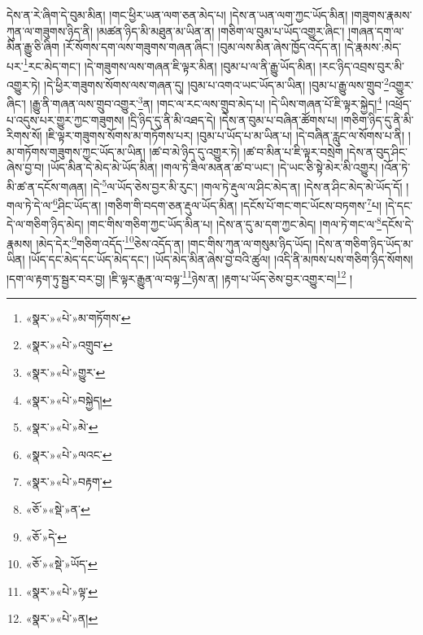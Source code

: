 དེས་ན་རེ་ཞིག་དེ་བུམ་མིན། །གང་ཕྱིར་ཡན་ལག་ཅན་མེད་པ། །དེས་ན་ཡན་ལག་ཀྱང་ཡོད་མིན། །གཟུགས་རྣམས་ཀུན་ལ་གཟུགས་ཉིད་ནི། །མཚན་ཉིད་མི་མཐུན་མ་ཡིན་ན། །གཅིག་ལ་བུམ་པ་ཡོད་འགྱུར་ཞིང་། །གཞན་དག་ལ་མིན་རྒྱུ་ཅི་ཞིག །རོ་སོགས་དག་ལས་གཟུགས་གཞན་ཞིང་། །བུམ་ལས་མིན་ཞེས་ཁྱོད་འདོད་ན། །དེ་རྣམས་:མེད་པར་\footnote{«སྣར་»«པེ་»མ་གཏོགས་}རང་མེད་གང་། །དེ་གཟུགས་ལས་གཞན་ཇི་ལྟར་མིན། །བུམ་པ་ལ་ནི་རྒྱུ་ཡོད་མིན། །རང་ཉིད་འབྲས་བུར་མི་འགྱུར་ཏེ། །དེ་ཕྱིར་གཟུགས་སོགས་ལས་གཞན་དུ། །བུམ་པ་འགའ་ཡང་ཡོད་མ་ཡིན། །བུམ་པ་རྒྱུ་ལས་གྲུབ་\footnote{«སྣར་»«པེ་»འགྲུབ་}འགྱུར་ཞིང་། །རྒྱུ་ནི་གཞན་ལས་གྲུབ་འགྱུར་\footnote{«སྣར་»«པེ་»གྱུར་}ན། །གང་ལ་རང་ལས་གྲུབ་མེད་པ། །དེ་ཡིས་གཞན་པོ་ཇི་ལྟར་སྐྱེད།\footnote{«སྣར་»«པེ་»བསྐྱེད།} །འཕྲོད་པ་འདུས་པར་གྱུར་ཀྱང་གཟུགས། །དྲི་ཉིད་དུ་ནི་མི་འཐད་དེ། །དེས་ན་བུམ་པ་བཞིན་ཚོགས་པ། །གཅིག་ཉིད་དུ་ནི་མི་རིགས་སོ། །ཇི་ལྟར་གཟུགས་སོགས་མ་གཏོགས་པར། །བུམ་པ་ཡོད་པ་མ་ཡིན་པ། །དེ་བཞིན་རླུང་ལ་སོགས་པ་ནི། །མ་གཏོགས་གཟུགས་ཀྱང་ཡོད་མ་ཡིན། །ཚ་བ་མེ་ཉིད་དུ་འགྱུར་ཏེ། །ཚ་བ་མིན་པ་ཇི་ལྟར་བསྲེག །དེས་ན་བུད་ཤིང་ཞེས་བྱ་བ། །ཡོད་མིན་དེ་མེད་མེ་ཡོད་མིན། །གལ་ཏེ་ཟིལ་མནན་ཚ་བ་ཡང་། །དེ་ཡང་ཅི་སྟེ་མེར་མི་འགྱུར། །འོན་ཏེ་མི་ཚ་ན་དངོས་གཞན། །དེ་\footnote{«སྣར་»«པེ་»མེ་}ལ་ཡོད་ཅེས་བྱར་མི་རུང་། །གལ་ཏེ་རྡུལ་ལ་ཤིང་མེད་ན། །དེས་ན་ཤིང་མེད་མེ་ཡོད་དོ། །གལ་ཏེ་དེ་ལ་\footnote{«སྣར་»«པེ་»ལའང་}ཤིང་ཡོད་ན། །གཅིག་གི་བདག་ཅན་རྡུལ་ཡོད་མིན། །དངོས་པོ་གང་གང་ཡོངས་བཏགས་\footnote{«སྣར་»«པེ་»བརྟག་}པ། །དེ་དང་དེ་ལ་གཅིག་ཉིད་མེད། །གང་གིས་གཅིག་ཀྱང་ཡོད་མིན་པ། །དེས་ན་དུ་མ་དག་ཀྱང་མེད། །གལ་ཏེ་གང་ལ་\footnote{«ཅོ་»«སྡེ་»ན་}དངོས་དེ་རྣམས། །མེད་དེར་\footnote{«ཅོ་»དེ་}གཅིག་འདོད་\footnote{«ཅོ་»«སྡེ་»ཡོད་}ཅེས་འདོད་ན། །གང་གིས་ཀུན་ལ་གསུམ་ཉིད་ཡོད། །དེས་ན་གཅིག་ཉིད་ཡོད་མ་ཡིན། །ཡོད་དང་མེད་དང་ཡོད་མེད་དང་། །ཡོད་མེད་མིན་ཞེས་བྱ་བའི་ཚུལ། །འདི་ནི་མཁས་པས་གཅིག་ཉིད་སོགས། །དག་ལ་རྟག་ཏུ་སྦྱར་བར་བྱ། །ཇི་ལྟར་རྒྱུན་ལ་བལྟ་\footnote{«སྣར་»«པེ་»ལྟ་}ཉེས་ན། །རྟག་པ་ཡོད་ཅེས་བྱར་འགྱུར་བ།\footnote{«སྣར་»«པེ་»ན།} །
